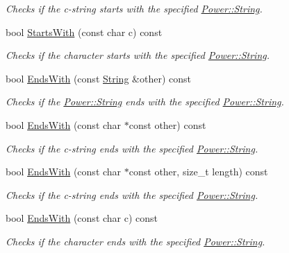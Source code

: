 \begin{DoxyCompactItemize}
\begin{DoxyCompactList}\small\item\em Checks if the c-\/string starts with the specified \hyperlink{class_power_1_1_string}{Power\+::\+String}. \end{DoxyCompactList}\item 
bool \hyperlink{class_power_1_1_string_a7c32b540950bc8b7061751333ec8ef17}{Starts\+With} (const char c) const
\begin{DoxyCompactList}\small\item\em Checks if the character starts with the specified \hyperlink{class_power_1_1_string}{Power\+::\+String}. \end{DoxyCompactList}\item 
bool \hyperlink{class_power_1_1_string_ae936d98f4be00ce5b901a561cac63ab0}{Ends\+With} (const \hyperlink{class_power_1_1_string}{String} \&other) const
\begin{DoxyCompactList}\small\item\em Checks if the \hyperlink{class_power_1_1_string}{Power\+::\+String} ends with the specified \hyperlink{class_power_1_1_string}{Power\+::\+String}. \end{DoxyCompactList}\item 
bool \hyperlink{class_power_1_1_string_a007514d96b8e99416e0c10f6b72675c5}{Ends\+With} (const char $\ast$const other) const
\begin{DoxyCompactList}\small\item\em Checks if the c-\/string ends with the specified \hyperlink{class_power_1_1_string}{Power\+::\+String}. \end{DoxyCompactList}\item 
bool \hyperlink{class_power_1_1_string_a7e5527a7258c8e83f19cc5a353a203b9}{Ends\+With} (const char $\ast$const other, size\+\_\+t length) const
\begin{DoxyCompactList}\small\item\em Checks if the c-\/string ends with the specified \hyperlink{class_power_1_1_string}{Power\+::\+String}. \end{DoxyCompactList}\item 
bool \hyperlink{class_power_1_1_string_a8f4b32bad7099116f14259d2bd0c4004}{Ends\+With} (const char c) const
\begin{DoxyCompactList}\small\item\em Checks if the character ends with the specified \hyperlink{class_power_1_1_string}{Power\+::\+String}. \end{DoxyCompactList}\item 

\end{DoxyCompactItemize}
